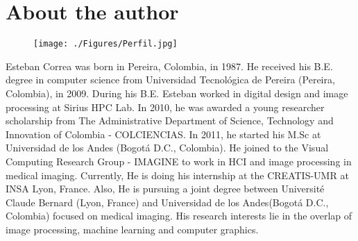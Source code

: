 \documentclass[a4paper, 11pt, oneside]{Thesis}  %
\begin{document}
\pagestyle{fancy}
\chapter{About the author}

\begin{figure}[h]
	\centering
		\texttt{[image: ./Figures/Perfil.jpg]}
	\label{fig:perfil}
\end{figure}

Esteban Correa was born in Pereira, Colombia, in 1987. He received his B.E. degree in computer science from Universidad Tecnol\'ogica de Pereira (Pereira, Colombia), in 2009. During his B.E. Esteban worked in digital design and image processing at Sirius HPC Lab. In 2010, he was awarded a young researcher scholarship from The Administrative Department of Science, Technology and Innovation of Colombia - COLCIENCIAS. In 2011, he started his M.Sc at Universidad de los Andes (Bogot\'a D.C., Colombia). He joined to the Visual Computing Research Group - IMAGINE to work in HCI and image processing in medical imaging.
Currently, He is doing his internship at the CREATIS-UMR at INSA Lyon, France. Also, He is pursuing a joint degree between Universit\'{e} Claude Bernard (Lyon, France) and Universidad de los Andes(Bogot\'a D.C., Colombia) focused on medical imaging.
His research interests lie in the overlap of image processing, machine learning and computer graphics.

\end{document}
